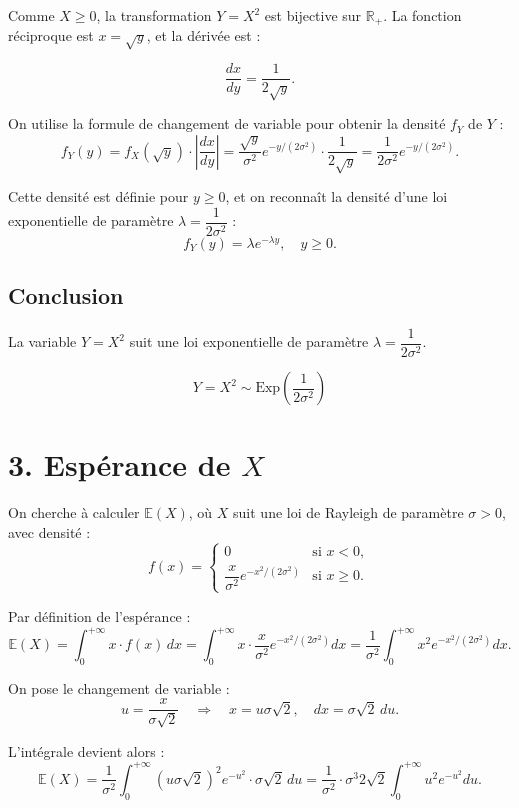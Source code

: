 \documentclass[a4paper,11pt]{article}
\begin{document}
Comme $X \geq 0$, la transformation $Y = X^2$ est bijective sur $\mathbb{R}_+$. La fonction réciproque est $x = \sqrt{y}$, et la dérivée est :

\[
\frac{dx}{dy} = \frac{1}{2\sqrt{y}}.
\]

On utilise la formule de changement de variable pour obtenir la densité $f_Y$ de $Y$ :
\[
f_Y(y) = f_X(\sqrt{y}) \cdot \left| \frac{dx}{dy} \right| = \frac{\sqrt{y}}{\sigma^2} e^{-y/(2\sigma^2)} \cdot \frac{1}{2\sqrt{y}} = \frac{1}{2\sigma^2} e^{-y/(2\sigma^2)}.
\]

Cette densité est définie pour $y \geq 0$, et on reconnaît la densité d'une loi exponentielle de paramètre $\lambda = \dfrac{1}{2\sigma^2}$ :
\[
f_Y(y) = \lambda e^{-\lambda y}, \quad y \geq 0.
\]

\subsection*{Conclusion}

La variable $Y = X^2$ suit une loi exponentielle de paramètre $\lambda = \dfrac{1}{2\sigma^2}$.

\[
\boxed{Y = X^2 \sim \text{Exp}\left( \dfrac{1}{2\sigma^2} \right)}
\]






\section*{3. Espérance de $X$}

On cherche à calculer $\mathbb{E}(X)$, où $X$ suit une loi de Rayleigh de paramètre $\sigma > 0$, avec densité :
\[
f(x) = \begin{cases}
0 & \text{si } x < 0, \\
\dfrac{x}{\sigma^2} e^{-x^2 / (2\sigma^2)} & \text{si } x \geq 0.
\end{cases}
\]

Par définition de l’espérance :
\[
\mathbb{E}(X) = \int_0^{+\infty} x \cdot f(x) \, dx = \int_0^{+\infty} x \cdot \frac{x}{\sigma^2} e^{-x^2 / (2\sigma^2)} dx = \frac{1}{\sigma^2} \int_0^{+\infty} x^2 e^{-x^2 / (2\sigma^2)} dx.
\]

On pose le changement de variable :
\[
u = \frac{x}{\sigma\sqrt{2}} \quad \Rightarrow \quad x = u \sigma\sqrt{2}, \quad dx = \sigma\sqrt{2} \, du.
\]

L’intégrale devient alors :
\[
\mathbb{E}(X) = \frac{1}{\sigma^2} \int_0^{+\infty} (u \sigma \sqrt{2})^2 e^{-u^2} \cdot \sigma \sqrt{2} \, du = \frac{1}{\sigma^2} \cdot \sigma^3 2\sqrt{2} \int_0^{+\infty} u^2 e^{-u^2} du.
\]
\end{document}
